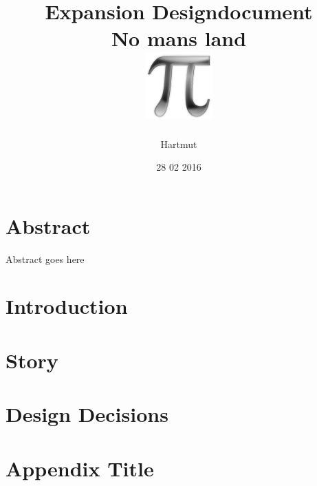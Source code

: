 \documentclass[a4paper,10pt]{book}
\title{
	{Expansion Designdocument}\\
	{\large No mans land}\\
	{\includegraphics{pi-black.png}}
}
\author{Hartmut}
\date{28 02 2016}
\begin{document}
\maketitle

\chapter*{Abstract}
Abstract goes here

\tableofcontents
\chapter{Introduction}

\chapter{Story}


\chapter{Design Decisions}


\appendix
\chapter{Appendix Title}

\end{document}
